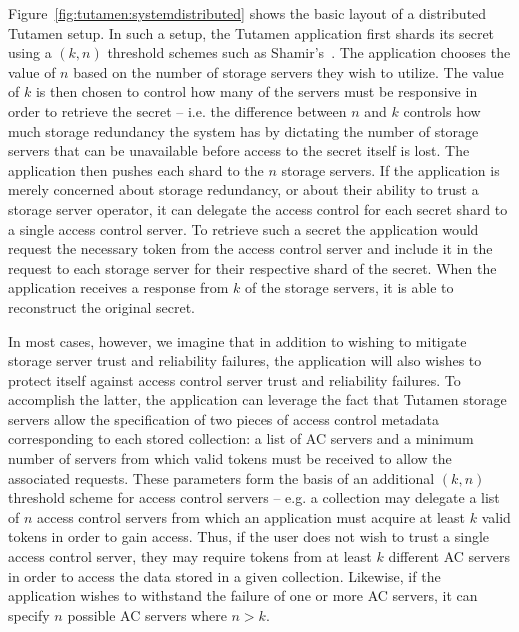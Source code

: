 Figure~\ref{fig:tutamen:systemdistributed} shows the basic layout of a
distributed Tutamen setup. In such a setup, the Tutamen application
first shards its secret using a $(k, n)$ threshold schemes such as
Shamir's~\cite{shamir1979}. The application chooses the value of $n$
based on the number of storage servers they wish to utilize. The value
of $k$ is then chosen to control how many of the servers must be
responsive in order to retrieve the secret -- i.e. the difference
between $n$ and $k$ controls how much storage redundancy the system
has by dictating the number of storage servers that can be unavailable
before access to the secret itself is lost. The application then
pushes each shard to the $n$ storage servers. If the application is
merely concerned about storage redundancy, or about their ability to
trust a storage server operator, it can delegate the access control for
each secret shard to a single access control server. To retrieve such
a secret the application would request the necessary token from the
access control server and include it in the request to each storage
server for their respective shard of the secret. When the application
receives a response from $k$ of the storage servers, it is able to
reconstruct the original secret.

In most cases, however, we imagine that in addition to wishing to
mitigate storage server trust and reliability failures, the
application will also wishes to protect itself against access control
server trust and reliability failures. To accomplish the latter, the
application can leverage the fact that Tutamen storage servers allow
the specification of two pieces of access control metadata
corresponding to each stored collection: a list of AC servers and a
minimum number of servers from which valid tokens must be received to
allow the associated requests. These parameters form the basis of an
additional $(k, n)$ threshold scheme for access control servers --
e.g. a collection may delegate a list of $n$ access control servers
from which an application must acquire at least $k$ valid tokens in
order to gain access. Thus, if the user does not wish to trust a
single access control server, they may require tokens from at least
$k$ different AC servers in order to access the data stored in a given
collection. Likewise, if the application wishes to withstand the
failure of one or more AC servers, it can specify $n$ possible AC
servers where $n > k$.

